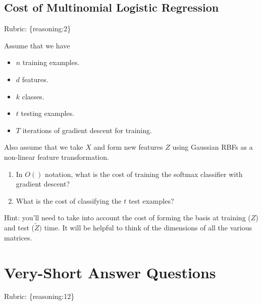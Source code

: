 \documentclass{article}
\def\rubric#1{\gre{Rubric: \{#1\}}}{}
\def\blu#1{{\color{blu}#1}}
\def\gre#1{{\color{gre}#1}}
\def\items#1{\begin{itemize}#1\end{itemize}}
\def\enum#1{\begin{enumerate}#1\end{enumerate}}
\begin{document}
\subsection{Cost of Multinomial Logistic Regression}
\rubric{reasoning:2}

Assume that we have
\items{
\item $n$ training examples.
\item $d$ features.
\item $k$ classes.
\item $t$ testing examples.
\item $T$ iterations of gradient descent for training.
}
Also assume that we take $X$ and form new features $Z$ using Gaussian RBFs as a non-linear feature transformation.
\blu{\enum{
\item In $O()$ notation, what is the cost of training the softmax classifier with gradient descent?
\item What is the cost of classifying the $t$ test examples?
}
}
Hint: you'll need to take into account the cost of forming the basis at training ($Z$) and test ($\tilde{Z})$ time. It will be helpful to think of the dimensions of all the various matrices.



\section{Very-Short Answer Questions}
\rubric{reasoning:12}
\end{document}
